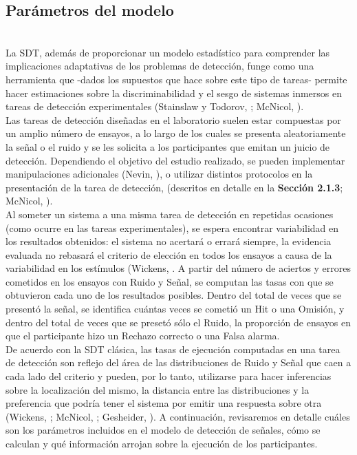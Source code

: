 \subsection{Parámetros del modelo}\\

La SDT, además de proporcionar un modelo estadístico para comprender las implicaciones adaptativas de los problemas de detección, funge como una herramienta que -dados los supuestos que hace sobre este tipo de tareas- permite hacer estimaciones sobre la discriminabilidad y el sesgo de sistemas inmersos en tareas de detección experimentales (Stainslaw y Todorov, \citeyear{Stainslaw1999}; McNicol, \citeyear{McNicol1}).\\

Las tareas de detección diseñadas en el laboratorio suelen estar compuestas por un amplio número de ensayos, a lo largo de los cuales se presenta aleatoriamente la señal o el ruido y se les solicita a los participantes que emitan un juicio de detección. Dependiendo el objetivo del estudio realizado, se pueden implementar manipulaciones adicionales (Nevin, \citeyear{Nevin1969}), o utilizar distintos protocolos en la presentación de la tarea de detección, (descritos en detalle en la \textbf{Sección 2.1.3}; McNicol, \citeyear{McNicol2}).\\

Al someter un sistema a una misma tarea de detección en repetidas ocasiones (como ocurre en las tareas experimentales), se espera encontrar variabilidad en los resultados obtenidos: el sistema no acertará o errará siempre, la evidencia evaluada no rebasará el criterio de elección en todos los ensayos a causa de la variabilidad en los estímulos (Wickens, \citeyear{Wickens1}. A partir del número de aciertos y errores cometidos en los ensayos con Ruido y Señal, se computan las tasas con que se obtuvieron cada uno de los resultados posibles. Dentro del total de veces que se presentó la señal, se identifica cuántas veces se cometió un Hit o una Omisión, y dentro del total de veces que se presetó sólo el Ruido, la proporción de ensayos en que el participante hizo un Rechazo correcto o una Falsa alarma.\\

De acuerdo con la SDT clásica, las tasas de ejecución computadas en una tarea de detección son reflejo del área de las distribuciones de Ruido y Señal que caen a cada lado del criterio y pueden, por lo tanto, utilizarse para hacer inferencias sobre la localización del mismo, la distancia entre las distribuciones y la preferencia que podría tener el sistema por emitir una respuesta sobre otra (Wickens, \citeyear{Wickens1}; McNicol, \citeyear{McNicol1}; Gesheider, \citeyear{Gescheider}). A continuación, revisaremos en detalle cuáles son los parámetros incluidos en el modelo de detección de señales, cómo se calculan y qué información arrojan sobre la ejecución de los participantes.\\

